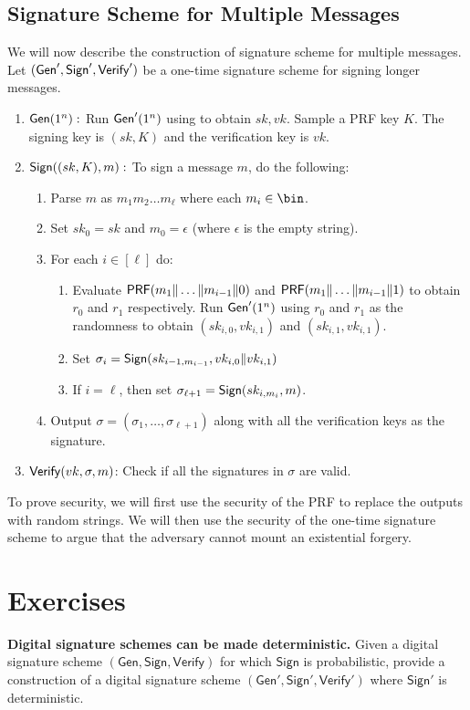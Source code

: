 \documentclass[12pt]{tufte-book}
\begin{document}
\subsection{Signature Scheme for Multiple Messages}
We will now describe the construction of signature scheme for multiple messages. Let $(\mathsf{Gen}',\mathsf{Sign}',\mathsf{Verify}')$ be a one-time signature scheme for signing longer messages. 
\begin{enumerate}
    \item $\mathsf{Gen}(1^n):$ Run $\mathsf{Gen}'(1^n)$ using to obtain $sk,vk$. Sample a PRF key $K$. The signing key is $(sk,K)$ and the verification key is $vk$.
    \item $\mathsf{Sign}((sk,K),m):$ To sign a message $m$, do the following:
    \begin{enumerate}
        \item Parse $m$ as $m_1m_2\ldots m_{\ell}$ where each $m_i \in \bin$.
        \item Set $sk_0 = sk$ and $m_0 = \epsilon$ (where $\epsilon$ is the empty string).
        \item For each $i \in [\ell]$ do:
        \begin{enumerate}
            \item Evaluate $\mathsf{PRF}(m_1\|\ldots\|m_{i-1}\|0)$ and $\mathsf{PRF}(m_1\|\ldots\|m_{i-1}\|1)$ to obtain $r_0$ and $r_1$ respectively. Run $\mathsf{Gen}'(1^n)$ using $r_0$ and $r_1$ as the randomness to obtain $(sk_{i,0},vk_{i,1})$ and $(sk_{i,1},vk_{i,1})$.
            \item Set $\sigma_i = \mathsf{Sign}(sk_{i-1,m_{i-1}},vk_{i,0}\|vk_{i,1})$
            \item If $i = \ell$, then set $\sigma_{\ell+1} = \mathsf{Sign}(sk_{i,m_i},m)$.

        \end{enumerate}
        \item Output $\sigma = (\sigma_1,\ldots,\sigma_{\ell+1})$ along with all the verification keys as the signature.
    \end{enumerate}
    \item $\mathsf{Verify}(vk,\sigma,m)$: Check if all the signatures in $\sigma$ are valid.
\end{enumerate}

To prove security, we will first use the security of the PRF to replace the outputs with random strings. We will then use the security of the one-time signature scheme to argue that the adversary cannot mount an existential forgery.

\section*{Exercises}
\begin{exercise}
\textbf{Digital signature schemes can be made deterministic.} Given a digital signature scheme $(\mathsf{Gen}, \mathsf{Sign}, \mathsf{Verify})$ for which $\mathsf{Sign}$ is probabilistic, provide a construction of a digital signature scheme $(\mathsf{Gen}', \mathsf{Sign}', \mathsf{Verify}')$ where $\mathsf{Sign}'$ is deterministic.
\end{exercise}
\end{document}
